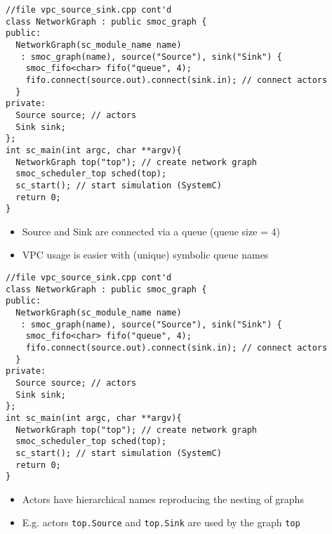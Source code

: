 \begin{frame}[fragile=singleslide]
\begin{lstlisting}
//file vpc_source_sink.cpp cont'd
class NetworkGraph : public smoc_graph {
public:
  NetworkGraph(sc_module_name name)
   : smoc_graph(name), source("Source"), sink("Sink") {
    smoc_fifo<char> fifo("queue", 4);
    fifo.connect(source.out).connect(sink.in); // connect actors
  }
private:
  Source source; // actors
  Sink sink;
};
int sc_main(int argc, char **argv){
  NetworkGraph top("top"); // create network graph
  smoc_scheduler_top sched(top);
  sc_start(); // start simulation (SystemC)
  return 0;
}
\end{lstlisting}
\begin{itemize}
\item Source and Sink are connected via a queue (queue size = 4)
\item VPC usage is easier with (unique) symbolic queue names
\end{itemize}
\end{frame}


\begin{frame}[fragile=singleslide]
\begin{lstlisting}
//file vpc_source_sink.cpp cont'd
class NetworkGraph : public smoc_graph {
public:
  NetworkGraph(sc_module_name name)
   : smoc_graph(name), source("Source"), sink("Sink") {
    smoc_fifo<char> fifo("queue", 4);
    fifo.connect(source.out).connect(sink.in); // connect actors
  }
private:
  Source source; // actors
  Sink sink;
};
int sc_main(int argc, char **argv){
  NetworkGraph top("top"); // create network graph
  smoc_scheduler_top sched(top);
  sc_start(); // start simulation (SystemC)
  return 0;
}
\end{lstlisting}
\begin{itemize}
\item Actors have hierarchical names reproducing the nesting of graphs
\item E.g. actors \lstinline!top.Source! and \lstinline!top.Sink! are used by the graph \lstinline!top!
\end{itemize}
\end{frame}


